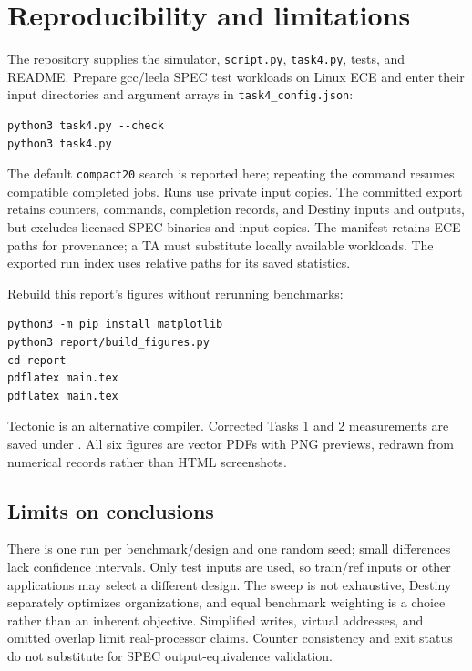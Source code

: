 \documentclass[10pt,letterpaper]{article}
\begin{document}
\clearpage
\section{Reproducibility and limitations}
The repository supplies the simulator, \texttt{script.py}, \texttt{task4.py},
tests, and README. Prepare gcc/leela SPEC test workloads on Linux ECE and enter
their input directories and argument arrays in \texttt{task4\_config.json}:
\begin{verbatim}
python3 task4.py --check
python3 task4.py
\end{verbatim}
The default \texttt{compact20} search is reported here; repeating the command
resumes compatible completed jobs. Runs use private input copies. The committed
export retains counters, commands, completion records, and Destiny inputs and
outputs, but excludes licensed SPEC binaries and input copies. The manifest
retains ECE paths for provenance; a TA must substitute locally available
workloads. The exported run index uses relative paths for its saved statistics.

Rebuild this report's figures without rerunning benchmarks:
\begin{verbatim}
python3 -m pip install matplotlib
python3 report/build_figures.py
cd report
pdflatex main.tex
pdflatex main.tex
\end{verbatim}
Tectonic is an alternative compiler. Corrected Tasks 1 and 2 measurements are
saved under . All six figures are vector PDFs with
PNG previews, redrawn from numerical records rather than HTML screenshots.

\subsection{Limits on conclusions}
There is one run per benchmark/design and one random seed; small differences
lack confidence intervals. Only test inputs are used, so train/ref inputs or
other applications may select a different design. The sweep is not exhaustive,
Destiny separately optimizes organizations, and equal benchmark weighting is
a choice rather than an inherent objective. Simplified writes, virtual addresses,
and omitted overlap limit real-processor claims. Counter consistency and exit
status do not substitute for SPEC output-equivalence validation.
\end{document}
